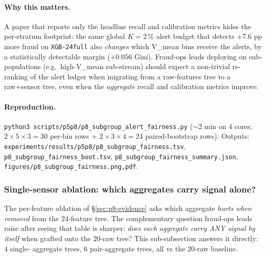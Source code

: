 \documentclass{article}
\begin{document}
\paragraph{Why this matters.}
A paper that reports only the headline recall and calibration metrics
hides the per-stratum footprint: the same global $K{=}2\,\%$ alert
budget that detects $+7.6$ pp more fraud on \texttt{XGB-24full} also
\emph{changes} which V\_mean bins receive the alerts, by a
statistically detectable margin ($+0.056$ Gini). Fraud-ops leads
deploying on sub-populations (e.g.\ high-V\_mean sub-stream) should
expect a non-trivial re-ranking of the alert ledger when migrating
from a raw-features tree to a raw+sensor tree, even when the
\emph{aggregate} recall and calibration metrics improve.

\paragraph{Reproduction.}
\texttt{python3 scripts/p5p8/p8\_subgroup\_alert\_fairness.py}
($\sim$2 min on 4 cores; $2 \times 5 \times 3 = 30$ per-bin rows +
$2 \times 3 \times 4 = 24$ paired-bootstrap rows). Outputs:
\texttt{experiments/results/p5p8/p8\_subgroup\_fairness.tsv},
\texttt{p8\_subgroup\_fairness\_boot.tsv},
\texttt{p8\_subgroup\_fairness\_summary.json},
\texttt{figures/p8\_subgroup\_fairness.{png,pdf}}.

\subsubsection{Single-sensor ablation: which aggregates carry signal alone?}
\label{sec:p8-single-sensor}

The per-feature ablation of \S\ref{sec:p8-evidence} asks which aggregate
\emph{hurts when removed} from the 24-feature tree. The complementary
question fraud-ops leads raise after seeing that table is sharper:
\emph{does each aggregate carry ANY signal by itself} when grafted onto
the 20-raw tree? This sub-subsection answers it directly: $4$ single-
aggregate trees, $6$ pair-aggregate trees, all vs the 20-raw baseline.
\end{document}
